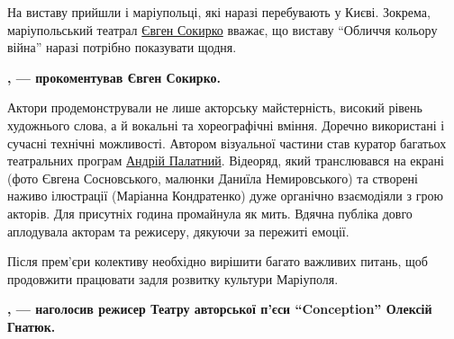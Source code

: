 
На виставу прийшли і маріупольці, які наразі перебувають у Києві. Зокрема,
маріупольський театрал
\href{https://www.facebook.com/profile.php?id=100007448023160}{Євген Сокирко}
вважає, що виставу \enquote{Обличчя кольору війна} наразі потрібно показувати
щодня.

\begin{leftbar}
	\begingroup
		\bfseries
{}, — прокоментував Євген Сокирко.
	\endgroup
\end{leftbar}


Актори продемонстрували не лише акторську майстерність, високий рівень
художнього слова, а й вокальні та хореографічні вміння. Доречно використані і
сучасні технічні можливості. Автором візуальної частини став куратор багатьох
театральних програм \href{https://www.facebook.com/andriipalatnyi}{Андрій Палатний}. Відеоряд, який транслювався на екрані
(фото Євгена Сосновського, малюнки Даниїла Немировського) та створені наживо
ілюстрації (Маріанна Кондратенко) дуже органічно взаємодіяли з грою акторів.
Для присутніх година промайнула як мить. Вдячна публіка довго аплодувала
акторам та режисеру, дякуючи за пережиті емоції. 


Після прем'єри колективу необхідно вирішити багато важливих питань, щоб
продовжити працювати задля розвитку культури Маріуполя. 

\begin{leftbar}
	\begingroup
		\bfseries
{}, —
наголосив режисер Театру авторської п'єси \enquote{Conception} Олексій Гнатюк.
	\endgroup
\end{leftbar}

